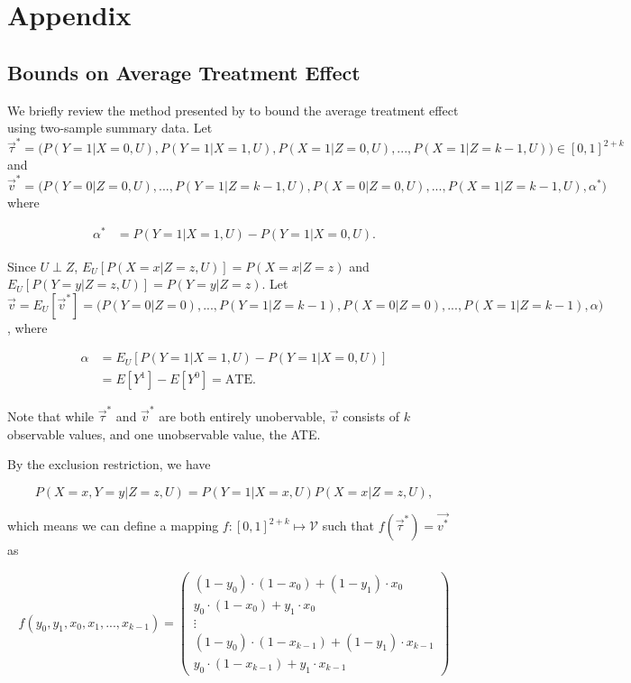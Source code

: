 \documentclass[
]{article}
\theoremstyle{plain}
\begin{document}
\newpage

\hypertarget{appendix-appendix}{%
\appendix}


\hypertarget{appendix}{%
\section{Appendix}\label{appendix}}

\hypertarget{bounds-on-average-treatment-effect}{%
\subsection{Bounds on Average Treatment Effect}\label{bounds-on-average-treatment-effect}}

We briefly review the method presented by \textcite{ramsahai_causal_2012} to bound the average treatment effect using two-sample summary data. Let \(\vec{\tau}^* = \Big(P(Y = 1 | X = 0, U), P(Y = 1 | X = 1, U), P(X = 1 | Z = 0, U), ..., P(X = 1 | Z = k-1, U)\Big) \in [0,1]^{2+k}\) and \(\vec{v}^* = \Big(P(Y = 0 | Z = 0, U), ..., P(Y = 1 | Z = k-1, U), P(X = 0 | Z = 0, U), ..., P(X = 1 | Z = k-1, U), \alpha^*\Big)\) where

\[
\begin{aligned}
\alpha^* &= P(Y = 1 | X = 1, U) - P(Y = 1 | X = 0, U).
\end{aligned}
\]

Since \(U \perp Z\), \(E_U[P(X = x | Z = z, U)] = P(X = x | Z = z)\) and \(E_U[P(Y = y | Z = z, U)] = P(Y = y | Z = z)\). Let \(\vec{v} = E_U[\vec{v}^*] = \Big(P(Y = 0 | Z = 0), ..., P(Y = 1 | Z = k-1), P(X = 0 | Z = 0), ..., P(X = 1 | Z = k-1), \alpha \Big)\), where

\[
\begin{aligned}
\alpha &= E_U[P(Y = 1 | X = 1, U) - P(Y = 1 | X = 0, U)] \\
       &= E[Y^1] - E[Y^0] = \text{ATE}.
\end{aligned}
\]

Note that while \(\vec{\tau}^*\) and \(\vec{v}^*\) are both entirely unobervable, \(\vec{v}\) consists of \(k\) observable values, and one unobservable value, the ATE.

By the exclusion restriction, we have

\[
P(X = x, Y = y | Z = z, U) = P(Y = 1 | X = x, U) P(X = x | Z = z, U),
\]

which means we can define a mapping \(f:[0,1]^{2+k} \mapsto \mathcal{V}\) such that \(f(\vec{\tau}^*) = \vec{v^*}\) as

\[
f(y_0, y_1, x_0, x_1, ..., x_{k-1}) =
  \begin{pmatrix}
    (1-y_0)\cdot(1-x_0) + (1 - y_1)\cdot x_0 \\
    y_0\cdot (1-x_0) + y_1\cdot x_0 \\
    \vdots \\
    (1-y_0)\cdot(1-x_{k-1}) + (1 - y_1)\cdot x_{k-1} \\
    y_0\cdot (1-x_{k-1}) + y_1\cdot x_{k-1}
  \end{pmatrix} \label{eq:f}
\]
\end{document}
